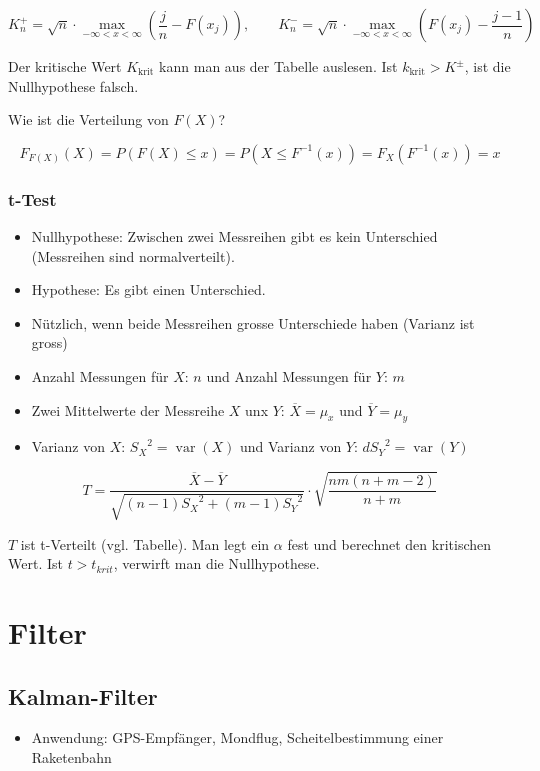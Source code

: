 \[ K_n^+ = \sqrt{n} \cdot \max_{-\infty<x<\infty} \left(\frac{j}{n} - F(x_j)\right)
, \qquad
K_n^- = \sqrt{n} \cdot \max_{-\infty<x<\infty} \left(F(x_j) - \frac{j-1}{n} \right) \]

Der kritische Wert $K_{\text{krit}}$ kann man aus der Tabelle auslesen.
Ist $k_{\text{krit}} > K^\pm$, ist die Nullhypothese falsch.

Wie ist die Verteilung von $F(X)$?

\[ F_{F(X)}(X) = P(F(X) \leq x) = P(X \leq F^{-1}(x)) = F_X(F^{-1}(x)) =
x \]

\subsubsection{t-Test}
\begin{itemize}
  \item Nullhypothese: Zwischen zwei Messreihen gibt es kein Unterschied
    (Messreihen sind normalverteilt).
  \item Hypothese: Es gibt einen Unterschied.
  \item Nützlich, wenn beide Messreihen grosse Unterschiede haben
    (Varianz ist gross)
  \item Anzahl Messungen für $X$: $n$ und Anzahl Messungen für $Y$: $m$
  \item Zwei Mittelwerte der Messreihe $X$ unx $Y$:
    $\overline{X} = \mu_x$ und $\overline{Y} = \mu_y$
  \item Varianz von $X$: ${S_X}^2 = \operatorname{var}(X)$ und Varianz
    von $Y$: $d {S_Y}^2 = \operatorname{var}(Y)$
\end{itemize}

\[ T = \frac{\overline{X} - \overline{Y}}{\sqrt{(n-1) {S_X}^2 + (m-1)
{S_Y}^2}} \cdot \sqrt{\frac{nm(n+m-2)}{n+m}}\]

$T$ ist t-Verteilt (vgl. Tabelle). Man legt ein $\alpha$ fest und berechnet den
kritischen Wert. Ist $t > t_{krit}$, verwirft man die Nullhypothese.

\section{Filter}
\subsection{Kalman-Filter}
\begin{itemize}
  \item Anwendung: GPS-Empfänger, Mondflug, Scheitelbestimmung einer
    Raketenbahn
\end{itemize}

